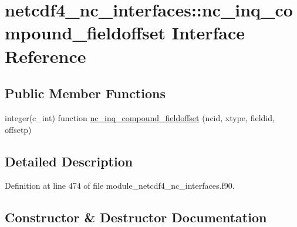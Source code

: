 \hypertarget{interfacenetcdf4__nc__interfaces_1_1nc__inq__compound__fieldoffset}{}\section{netcdf4\+\_\+nc\+\_\+interfaces\+:\+:nc\+\_\+inq\+\_\+compound\+\_\+fieldoffset Interface Reference}
\label{interfacenetcdf4__nc__interfaces_1_1nc__inq__compound__fieldoffset}
\subsection*{Public Member Functions}
\begin{DoxyCompactItemize}
\item 
integer(c\+\_\+int) function \hyperlink{interfacenetcdf4__nc__interfaces_1_1nc__inq__compound__fieldoffset_af370021aab653b74323f0840224a91c4}{nc\+\_\+inq\+\_\+compound\+\_\+fieldoffset} (ncid, xtype, fieldid, offsetp)
\end{DoxyCompactItemize}


\subsection{Detailed Description}


Definition at line 474 of file module\+\_\+netcdf4\+\_\+nc\+\_\+interfaces.\+f90.



\subsection{Constructor \& Destructor Documentation}
\mbox{\label{interfacenetcdf4__nc__interfaces_1_1nc__inq__compound__fieldoffset_af370021aab653b74323f0840224a91c4}} 
